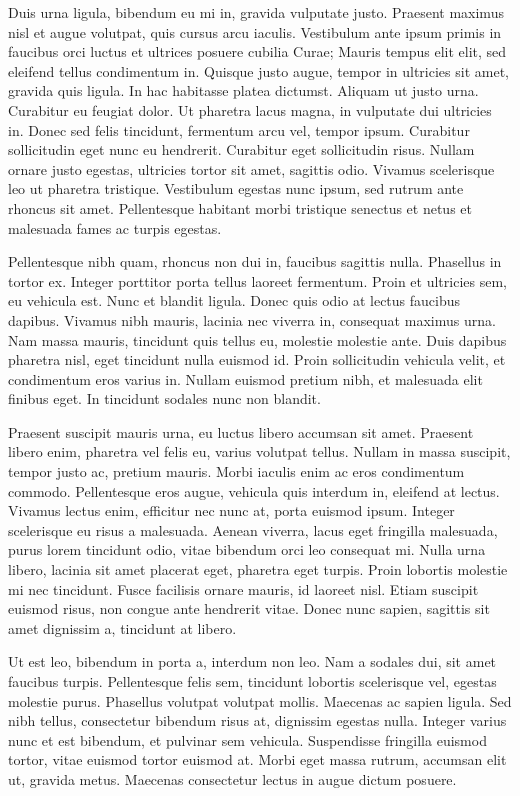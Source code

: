 Duis urna ligula, bibendum eu mi in, gravida vulputate justo. Praesent maximus nisl et augue volutpat, quis cursus arcu iaculis. Vestibulum ante ipsum primis in faucibus orci luctus et ultrices posuere cubilia Curae; Mauris tempus elit elit, sed eleifend tellus condimentum in. Quisque justo augue, tempor in ultricies sit amet, gravida quis ligula. In hac habitasse platea dictumst. Aliquam ut justo urna. Curabitur eu feugiat dolor. Ut pharetra lacus magna, in vulputate dui ultricies in. Donec sed felis tincidunt, fermentum arcu vel, tempor ipsum. Curabitur sollicitudin eget nunc eu hendrerit. Curabitur eget sollicitudin risus. Nullam ornare justo egestas, ultricies tortor sit amet, sagittis odio. Vivamus scelerisque leo ut pharetra tristique. Vestibulum egestas nunc ipsum, sed rutrum ante rhoncus sit amet. Pellentesque habitant morbi tristique senectus et netus et malesuada fames ac turpis egestas.

Pellentesque nibh quam, rhoncus non dui in, faucibus sagittis nulla. Phasellus in tortor ex. Integer porttitor porta tellus laoreet fermentum. Proin et ultricies sem, eu vehicula est. Nunc et blandit ligula. Donec quis odio at lectus faucibus dapibus. Vivamus nibh mauris, lacinia nec viverra in, consequat maximus urna. Nam massa mauris, tincidunt quis tellus eu, molestie molestie ante. Duis dapibus pharetra nisl, eget tincidunt nulla euismod id. Proin sollicitudin vehicula velit, et condimentum eros varius in. Nullam euismod pretium nibh, et malesuada elit finibus eget. In tincidunt sodales nunc non blandit.

Praesent suscipit mauris urna, eu luctus libero accumsan sit amet. Praesent libero enim, pharetra vel felis eu, varius volutpat tellus. Nullam in massa suscipit, tempor justo ac, pretium mauris. Morbi iaculis enim ac eros condimentum commodo. Pellentesque eros augue, vehicula quis interdum in, eleifend at lectus. Vivamus lectus enim, efficitur nec nunc at, porta euismod ipsum. Integer scelerisque eu risus a malesuada. Aenean viverra, lacus eget fringilla malesuada, purus lorem tincidunt odio, vitae bibendum orci leo consequat mi. Nulla urna libero, lacinia sit amet placerat eget, pharetra eget turpis. Proin lobortis molestie mi nec tincidunt. Fusce facilisis ornare mauris, id laoreet nisl. Etiam suscipit euismod risus, non congue ante hendrerit vitae. Donec nunc sapien, sagittis sit amet dignissim a, tincidunt at libero.

Ut est leo, bibendum in porta a, interdum non leo. Nam a sodales dui, sit amet faucibus turpis. Pellentesque felis sem, tincidunt lobortis scelerisque vel, egestas molestie purus. Phasellus volutpat volutpat mollis. Maecenas ac sapien ligula. Sed nibh tellus, consectetur bibendum risus at, dignissim egestas nulla. Integer varius nunc et est bibendum, et pulvinar sem vehicula. Suspendisse fringilla euismod tortor, vitae euismod tortor euismod at. Morbi eget massa rutrum, accumsan elit ut, gravida metus. Maecenas consectetur lectus in augue dictum posuere.

